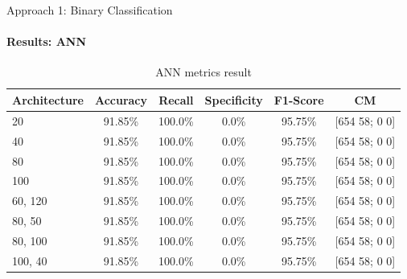 \documentclass[9pt, pstricks, xcolor=dvipsnames]{beamer}
\begin{document}
\begin{frame}{Approach 1: Binary Classification}
\framesubtitle{Results: ANN}
\begin{table}[H]
    \centering
    \begin{tabular}{lccccc}
        \toprule
        Architecture & Accuracy & Recall & Specificity & F1-Score & CM\\
        \midrule
        20 & 91.85\%  & 100.0\%  & 0.0\%  & 95.75\% & [654 58; 0 0] \\
        40 & 91.85\%  & 100.0\%  & 0.0\%  & 95.75\% & [654 58; 0 0] \\
        80 & 91.85\%  & 100.0\%  & 0.0\%  & 95.75\% & [654 58; 0 0] \\
        100 & 91.85\%  & 100.0\%  & 0.0\%  & 95.75\% & [654 58; 0 0] \\
        60, 120 & 91.85\%  & 100.0\%  & 0.0\%  & 95.75\% & [654 58; 0 0] \\
        80, 50 & 91.85\%  & 100.0\%  & 0.0\%  & 95.75\% & [654 58; 0 0] \\
        80, 100 & 91.85\%  & 100.0\%  & 0.0\%  & 95.75\% & [654 58; 0 0] \\
        100, 40 & 91.85\%  & 100.0\%  & 0.0\%  & 95.75\% & [654 58; 0 0] \\

        \bottomrule
    \end{tabular}
    \caption{ANN metrics result}
    \label{tab:ann_approach1}
\end{table}
\end{frame}
\end{document}
